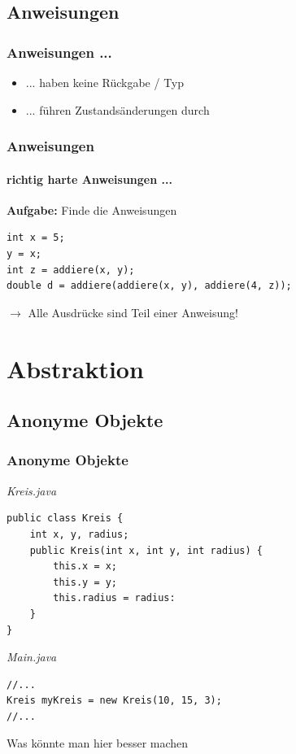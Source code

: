 \documentclass[18pt]{beamer}
\begin{document}

\subsection{Anweisungen}
\begin{frame}
	\frametitle{Anweisungen ...}

		\pause
		\begin{itemize}
			\item ... haben keine Rückgabe / Typ
			\item ... führen Zustandsänderungen durch
		\end{itemize}
\end{frame}

\begin{frame}[containsverbatim]
	\frametitle{Anweisungen}
	\framesubtitle{richtig harte Anweisungen ...}
	
		\textbf{Aufgabe:} Finde die Anweisungen
		\begin{lstlisting}
int x = 5;
y = x;
int z = addiere(x, y);
double d = addiere(addiere(x, y), addiere(4, z));\end{lstlisting}
		
		
		
		\pause $\rightarrow$ Alle Ausdrücke sind Teil einer Anweisung!
\end{frame}


\section{Abstraktion}
\subsection{Anonyme Objekte}
\begin{frame}[containsverbatim]
	\frametitle{Anonyme Objekte}
		\emph{Kreis.java}
		\begin{lstlisting}
public class Kreis {
	int x, y, radius;
	public Kreis(int x, int y, int radius) {
		this.x = x;
		this.y = y;
		this.radius = radius:
	}
}
		\end{lstlisting}
		
		\emph{Main.java}
		\begin{lstlisting}
//...
Kreis myKreis = new Kreis(10, 15, 3);
//...
		\end{lstlisting}
		
		Was könnte man hier besser machen
\end{frame}
\end{document}
